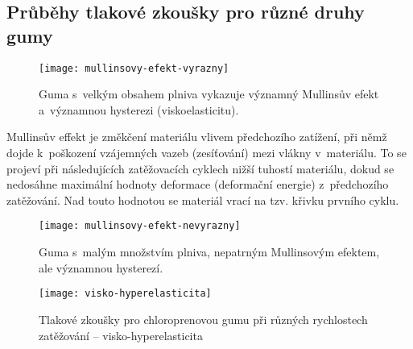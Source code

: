 
\subsection{Průběhy tlakové zkoušky pro různé druhy gumy}
\begin{figure}[H]
	\centering
	\texttt{[image: mullinsovy-efekt-vyrazny]}
	\caption{Guma s~velkým obsahem plniva vykazuje významný Mullinsův efekt a~významnou hysterezi (viskoelasticitu).}
	\label{fig:mullinsovy-efekt-vyrazny}
\end{figure}

Mullinsův effekt je změkčení materiálu vlivem předchozího zatížení, při němž dojde k~poškození vzájemných vazeb (zesíťování) mezi vlákny v~materiálu. To se projeví při následujících zatěžovacích cyklech nižší tuhostí materiálu, dokud se nedosáhne maximální hodnoty deformace (deformační energie) z~předchozího zatěžování. Nad touto hodnotou se materiál vrací na tzv.  křivku prvního cyklu.

\begin{figure}[H]
	\centering
	\texttt{[image: mullinsovy-efekt-nevyrazny]}
	\caption{Guma s~malým množstvím plniva, nepatrným Mullinsovým efektem, ale významnou hysterezí.}
	\label{fig:mullinsovy-efekt-nevyrazny}
\end{figure}

\begin{figure}[H]
	\centering
	\texttt{[image: visko-hyperelasticita]}
	\caption{Tlakové zkoušky pro chloroprenovou gumu při různých rychlostech zatěžování -- visko-hyperelasticita}
	\label{fig:visko-hyperelasticita}
\end{figure}
